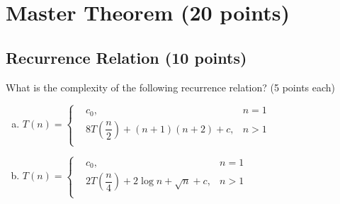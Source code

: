 \documentclass[11pt]{exam}
\begin{document}
\newpage
\section{Master Theorem (20 points)}
\subsection{Recurrence Relation (10 points)}
What is the complexity of the following recurrence relation? (5 points each)
\begin{enumerate}[(a)]

    \item $T(n) = \left\{
              \begin{aligned}
                   & c_0,                                            & n=1 \\
                   & 8T\left(\dfrac{n}{2}\right)+(n + 1)(n + 2) + c, & n>1 \\
              \end{aligned}
              \right.
          $

          \begin{solution}

          \end{solution}

    \item $T(n) = \left\{
              \begin{aligned}
                   & c_0,                                            & n=1 \\
                   & 2T\left(\dfrac{n}{4}\right)+2\log n+\sqrt{n}+c, & n>1 \\
              \end{aligned}
              \right.
          $

          \begin{solution}

          \end{solution}
\end{enumerate}
\end{document}
